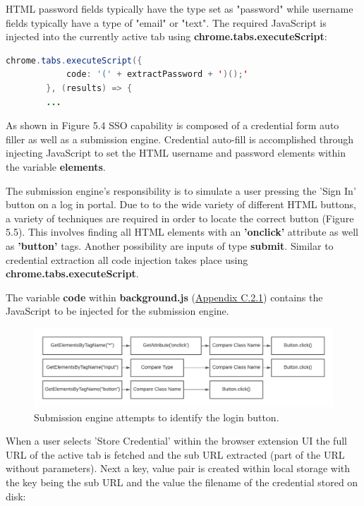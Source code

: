 HTML password fields typically have the type set as "password" while username fields typically have a type of  "email" or "text". The required JavaScript is injected into the currently active tab using \textbf{chrome.tabs.executeScript}:

\begin{lstlisting}[language=Java]
chrome.tabs.executeScript({
            code: '(' + extractPassword + ')();'
        }, (results) => {
        ...
\end{lstlisting}


As shown in Figure 5.4 SSO capability is composed of a credential form auto filler as well as a submission engine. Credential auto-fill is accomplished through injecting JavaScript to set the HTML username and password elements within the variable \textbf{elements}. 

The submission engine's responsibility is to simulate a user pressing the 'Sign In' button on a log in portal. Due to to the wide variety of different HTML buttons, a variety of techniques are required in order to locate the correct button (Figure 5.5). This involves finding all HTML elements with an \textbf{'onclick'} attribute as well as \textbf{'button'} tags. Another possibility are inputs of type \textbf{submit}. Similar to credential extraction all code injection takes place using \textbf{chrome.tabs.executeScript}. 

The variable \textbf{code} within \textbf{background.js} (\hyperref[sec:back]{Appendix C.2.1}) contains the JavaScript to be injected for the submission engine.

\begin{figure}[H]
\centering
\includegraphics[width=1.1\columnwidth]{Figures/Fig_62.png}
\caption{Submission engine attempts to identify the login button.}
\label{fig:gantt}
\end{figure}

When a user selects 'Store Credential' within the browser extension UI the full URL of the active tab is fetched and the sub URL extracted (part of the URL without parameters). Next a key, value pair is created within local storage with the key being the sub URL and the value the filename of the credential stored on disk:

